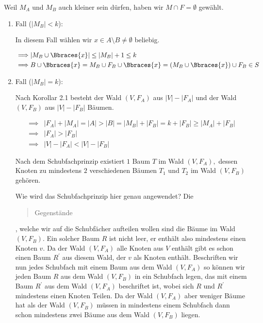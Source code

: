 \begin{solution}
\begin{enumerate}[label = \arabic*.]
    Weil $M_A$ und $M_B$ auch kleiner sein dürfen, haben wir $M \cap F = \emptyset$ gewählt.

    \begin{enumerate}[label = \arabic*.]
        
        \item Fall ($|M_B| < k$):
        
        In diesem Fall wählen wir $x \in A \setminus B \neq \emptyset$ beliebig.

        \begin{align*}
            \implies &
            |M_B \cup \Bbraces{x}| \leq |M_B| + 1 \leq k \\
            \implies &
            B \cup \Bbraces{x}
            =
            M_B \cup F_B \cup \Bbraces{x}
            =
            (M_B \cup \Bbraces{x}) \cup F_B
            \in
            S
        \end{align*}
        
        \item Fall ($|M_B| = k$):
        
        Nach Korollar 2.1 besteht der Wald $(V, F_A)$ aus $|V| - |F_A|$ und der Wald $(V, F_B)$ aus $|V| - |F_B|$ Bäumen.

        \begin{align*}
            \implies &
            |F_A| + |M_A|  = |A| > |B| = |M_B| + |F_B| = k + |F_B| \geq |M_A| + |F_B| \\
            \implies &
            |F_A| > |F_B| \\
            \implies &
            |V| - |F_A| < |V| - |F_B|
        \end{align*}

        Nach dem Schubfachprinzip existiert $1$ Baum $T$ im Wald $(V, F_A),$ dessen Knoten zu mindestens $2$ verschiedenen Bäumen $T_1$ und $T_2$ im Wald $(V, F_B)$ gehören.

        Wie wird das Schubfachprinzip hier genau angewendet?
        Die \blockquote{Gegenstände}, welche wir auf die Schubfächer aufteilen wollen sind die Bäume im Wald $(V, F_B)$.
        Ein solcher Baum $R$ ist nicht leer, er enthält also mindestens einen Knoten $v$.
        Da der Wald $(V, F_A)$ alle Knoten aus $V$ enthält gibt es schon einen Baum $R^\prime$ aus diesem Wald, der $v$ als Knoten enthält.
        Beschriften wir nun jedes Schubfach mit einem Baum aus dem Wald $(V, F_A)$ so können wir jeden Baum $R$ aus dem Wald $(V, F_B)$ in ein Schubfach legen, das mit einem Baum $R^\prime$ aus dem Wald $(V, F_A)$ beschriftet ist, wobei sich $R$ und $R^\prime$ mindestens einen Knoten Teilen.
        Da der Wald $(V, F_A)$ aber weniger Bäume hat als der Wald $(V, F_B)$ müssen in mindestens einem Schubfach dann schon mindestens zwei Bäume aus dem Wald $(V, F_B)$ liegen.


\end{enumerate}
\end{enumerate}
\end{solution}
